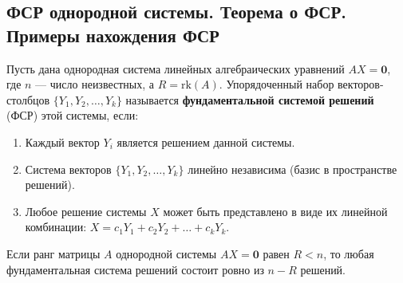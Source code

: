\subsection{ФСР однородной системы. Теорема о ФСР. Примеры нахождения ФСР}

\begin{definition}
Пусть дана однородная система линейных алгебраических уравнений $AX = \mathbf{0}$, где $n$ --- число неизвестных, а $R = \mathrm{rk}(A)$. Упорядоченный набор векторов-столбцов $\{Y_1, Y_2, \dots, Y_k\}$ называется \textbf{фундаментальной системой решений} (ФСР) этой системы, если:
\begin{enumerate}
    \item Каждый вектор $Y_i$ является решением данной системы.
    \item Система векторов $\{Y_1, Y_2, \dots, Y_k\}$ линейно независима (базис в пространстве решений).
    \item Любое решение системы $X$ может быть представлено в виде их линейной комбинации: $X = c_1 Y_1 + c_2 Y_2 + \dots + c_k Y_k$.
\end{enumerate}
\end{definition}

\begin{theorem}
Если ранг матрицы $A$ однородной системы $AX = \mathbf{0}$ равен $R < n$, то любая фундаментальная система решений состоит ровно из $n - R$ решений.
\end{theorem}

